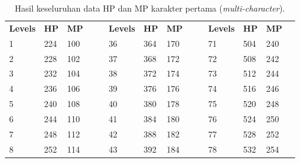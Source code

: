 \begin{table}[!h]
	\centering
	\caption{Hasil keseluruhan data HP dan MP karakter pertama (\textit{multi-character}).}
	\vspace{-1ex}
	\label{tb:player_hp_mp_all_1}
	\begin{tabular}{|l|l|l|ll|l|l|l|llllll}
		\cline{1-3} \cline{6-8} \cline{11-13}
		\cellcolor[HTML]{C0C0C0}\textbf{Levels} & \cellcolor[HTML]{C0C0C0}\textbf{HP} & \cellcolor[HTML]{C0C0C0}\textbf{MP} &  &  & \cellcolor[HTML]{C0C0C0}\textbf{Levels} & \cellcolor[HTML]{C0C0C0}\textbf{HP} & \cellcolor[HTML]{C0C0C0}\textbf{MP} &  & \multicolumn{1}{l|}{} & \multicolumn{1}{l|}{\cellcolor[HTML]{C0C0C0}\textbf{Levels}} & \multicolumn{1}{l|}{\cellcolor[HTML]{C0C0C0}\textbf{HP}} & \multicolumn{1}{l|}{\cellcolor[HTML]{C0C0C0}\textbf{MP}} &  \\ \cline{1-3} \cline{6-8} \cline{11-13}
		1 & 224 & 100 &  &  & 36 & 364 & 170 &  & \multicolumn{1}{l|}{} & \multicolumn{1}{l|}{71} & \multicolumn{1}{l|}{504} & \multicolumn{1}{l|}{240} &  \\ \cline{1-3} \cline{6-8} \cline{11-13}
		2 & 228 & 102 &  &  & 37 & 368 & 172 &  & \multicolumn{1}{l|}{} & \multicolumn{1}{l|}{72} & \multicolumn{1}{l|}{508} & \multicolumn{1}{l|}{242} &  \\ \cline{1-3} \cline{6-8} \cline{11-13}
		3 & 232 & 104 &  &  & 38 & 372 & 174 &  & \multicolumn{1}{l|}{} & \multicolumn{1}{l|}{73} & \multicolumn{1}{l|}{512} & \multicolumn{1}{l|}{244} &  \\ \cline{1-3} \cline{6-8} \cline{11-13}
		4 & 236 & 106 &  &  & 39 & 376 & 176 &  & \multicolumn{1}{l|}{} & \multicolumn{1}{l|}{74} & \multicolumn{1}{l|}{516} & \multicolumn{1}{l|}{246} &  \\ \cline{1-3} \cline{6-8} \cline{11-13}
		5 & 240 & 108 &  &  & 40 & 380 & 178 &  & \multicolumn{1}{l|}{} & \multicolumn{1}{l|}{75} & \multicolumn{1}{l|}{520} & \multicolumn{1}{l|}{248} &  \\ \cline{1-3} \cline{6-8} \cline{11-13}
		6 & 244 & 110 &  &  & 41 & 384 & 180 &  & \multicolumn{1}{l|}{} & \multicolumn{1}{l|}{76} & \multicolumn{1}{l|}{524} & \multicolumn{1}{l|}{250} &  \\ \cline{1-3} \cline{6-8} \cline{11-13}
		7 & 248 & 112 &  &  & 42 & 388 & 182 &  & \multicolumn{1}{l|}{} & \multicolumn{1}{l|}{77} & \multicolumn{1}{l|}{528} & \multicolumn{1}{l|}{252} &  \\ \cline{1-3} \cline{6-8} \cline{11-13}
		8 & 252 & 114 &  &  & 43 & 392 & 184 &  & \multicolumn{1}{l|}{} & \multicolumn{1}{l|}{78} & \multicolumn{1}{l|}{532} & \multicolumn{1}{l|}{254} &  \\ \cline{1-3} \cline{6-8} \cline{11-13}

\end{tabular}
\end{table}
